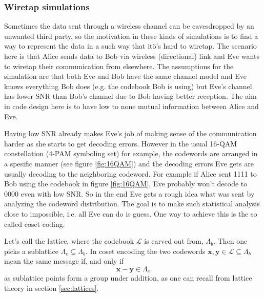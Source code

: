 \documentclass[english,12pt,a4paper,pdftex,sci,utf8]{aaltothesis}
\begin{document}
\subsubsection{Wiretap simulations}
Sometimes the data sent through a wireless channel can be eavesdropped by an unwanted third party, so the motivation in these kinds of simulations is to find a way to represent the data in a such way that itö's hard to wiretap. The scenario here is that Alice sends data to Bob via wireless (directional) link and Eve wants to wiretap their communication from elsewhere. The assumptions for the simulation are that both Eve and Bob have the same channel model and Eve knows everything Bob does (e.g. the codebook Bob is using) but Eve's channel has lower SNR than Bob's channel due to Bob having better reception. The aim in code design here is to have low to none mutual information between Alice and Eve. 
\par Having low SNR already makes Eve's job of making sense of the communication harder as she starts to get decoding errors. However in the usual 16-QAM constellation (4-PAM symboling set) for example, the codewords are arranged in a spesific manner (see figure \ref{fig:16QAM}) and the decoding errors Eve gets are usually decoding to the neighboring codeword. For example if Alice sent 1111 to Bob using the codebook in figure \ref{fig:16QAM}, Eve probably won't decode to 0000 even with low SNR. So in the end Eve gets a rough idea what was sent by analyzing the codeword distribution. The goal is to make such statistical analysis close to impossible, i.e. all Eve can do is guess. One way to achieve this is the so called coset coding. 
\par Let's call the lattice, where the codebook $\mathcal{L}$ is carved out from, $\Lambda_b$. Then one picks a sublattice $\Lambda_e \subsetneq \Lambda_b$. In coset encoding the two codewords $\mathbf{x, y} \in \mathcal{L} \subseteq \Lambda_b$ mean the same message if, and only if
\begin{equation}
\mathbf{x - y} \in \Lambda_e
\end{equation}
as sublattice points form a group under addition, as one can recall from lattice theory in section \ref{sec:lattices}. 
\end{document}
